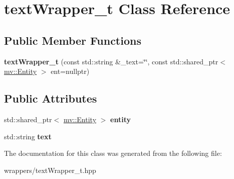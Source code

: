 \hypertarget{classtext_wrapper__t}{}\section{text\+Wrapper\+\_\+t Class Reference}
\label{classtext_wrapper__t}
\subsection*{Public Member Functions}
\begin{DoxyCompactItemize}
\item 
\mbox{\label{classtext_wrapper__t_ac6deabaeda554cb7fb689f0d61ad7289}} 
{\bfseries text\+Wrapper\+\_\+t} (const std\+::string \&\+\_\+text=\char`\"{}\char`\"{}, const std\+::shared\+\_\+ptr$<$ \mbox{\hyperlink{classmv_1_1_entity}{mv\+::\+Entity}} $>$ ent=nullptr)
\end{DoxyCompactItemize}
\subsection*{Public Attributes}
\begin{DoxyCompactItemize}
\item 
\mbox{\label{classtext_wrapper__t_ae98a33e955421fd0c537346634e131e6}} 
std\+::shared\+\_\+ptr$<$ \mbox{\hyperlink{classmv_1_1_entity}{mv\+::\+Entity}} $>$ {\bfseries entity}
\item 
\mbox{\label{classtext_wrapper__t_a82f0febb5d1163b192d6cb79ee229bae}} 
std\+::string {\bfseries text}
\end{DoxyCompactItemize}


The documentation for this class was generated from the following file\+:\begin{DoxyCompactItemize}
\item 
wrappers/text\+Wrapper\+\_\+t.\+hpp\end{DoxyCompactItemize}
